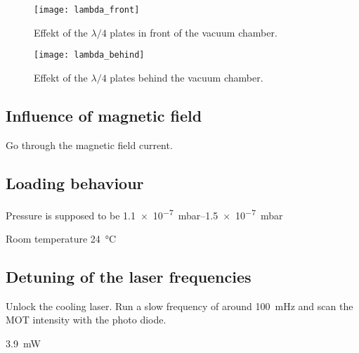 \documentclass[11pt, english, fleqn, DIV=15, headinclude, BCOR=2cm]{scrreprt}
\begin{document}
\begin{figure}
    \centering
    \texttt{[image: lambda\_front]}
    \caption{%
        Effekt of the $\lambda/4$ plates in front of the vacuum chamber.
    }
    \label{fig:lambda_front}
\end{figure}

\begin{figure}
    \centering
    \texttt{[image: lambda\_behind]}
    \caption{%
        Effekt of the $\lambda/4$ plates behind the vacuum chamber.
    }
    \label{fig:lambda_behind}
\end{figure}

\subsection{Influence of magnetic field}

Go through the magnetic field current.


\subsection{Loading behaviour}

Pressure is supposed to be \SIrange{1.1e-7}{1.5e-7}{\milli\bar}

Room temperature \SI{24}{\celsius}

\subsection{Detuning of the laser frequencies}

Unlock the cooling laser. Run a slow frequency of around \SI{100}{\milli\hertz}
and scan the MOT intensity with the photo diode. 

\SI{3.9}{\milli\watt}
\end{document}
